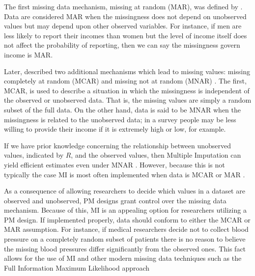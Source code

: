 \documentclass{svjour3}                     %
\begin{document}
The first missing data mechanism, missing at random (MAR), was defined by \citet{rubin1976inference}. Data are considered MAR when the missingness does not depend on unobserved values but may depend upon other observed variables. For instance, if men are less likely to report their incomes than women but the level of income itself does not affect the probability of reporting, then we can say the missingness govern income is MAR. \par

Later, \citet{little2014statistical} described two additional mechanisms which lead to missing values: missing completely at random (MCAR) and missing not at random (MNAR) \citep{little2014statistical}. The first, MCAR, is used to describe a situation in which the missingness is independent of the observed or unobserved data. That is, the missing values are simply a random subset of the full data. On the other hand, data is said to be MNAR when the missingness is related to the unobserved data; in a survey people may be less willing to provide their income if it is extremely high or low, for example. \par

If we have prior knowledge concerning the relationship between unobserved values, indicated by $R$, and the observed values, then Multiple Imputation can yield efficient estimates even under MNAR \citep{harel2007multiple}. However, because this is not typically the case MI is most often implemented when data is MCAR or MAR \citep{little2014statistical}. \par 
As a consequence of allowing researchers to decide which values in a dataset are observed and unobserved, PM designs grant control over the missing data mechanism. Because of this, MI is an appealing option for researchers utilizing a PM design. If implemented properly, data should conform to either the MCAR or MAR assumption. For instance, if medical researchers decide not to collect blood pressure on a completely random subset of patients there is no reason to believe the missing blood pressures differ significantly from the observed ones. This fact allows for the use of MI and other modern missing data techniques such as the Full Information Maximum Likelihood approach \citep{dempster1977maximum} \par
\end{document}
